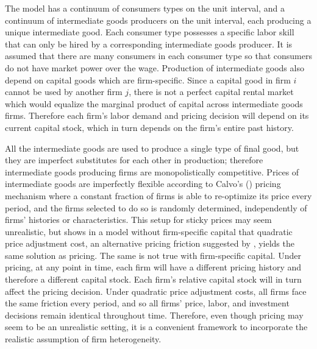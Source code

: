The model has a continuum of consumers types on the unit interval, and a continuum of intermediate goods producers on the unit interval, each producing a unique intermediate good.  Each consumer type possesses a specific labor skill that can only be hired by a corresponding intermediate goods producer.  It is assumed that there are many consumers in each consumer type so that consumers do not have market power over the wage.  Production of intermediate goods also depend on capital goods which are firm-specific.  Since a capital good in firm $i$ cannot be used by another firm $j$, there is not a perfect capital rental market which would equalize the marginal product of capital across intermediate goods firms.  Therefore each firm's labor demand and pricing decision will depend on its current capital stock, which in turn depends on the firm's entire past history.

All the intermediate goods are used to produce a single type of final good, but they are imperfect substitutes for each other in production; therefore intermediate goods producing firms are monopolistically competitive.  Prices of intermediate goods are imperfectly flexible according to Calvo's (\citeyear{calvo1983}) pricing mechanism where a constant fraction of firms is able to re-optimize its price every period, and the firms selected to do so is randomly determined, independently of firms' histories or characteristics.  This setup for sticky prices may seem unrealistic, but  shows in a model without firm-specific capital that quadratic price adjustment cost, an alternative pricing friction suggested by , yields the same solution as  pricing.  The same is not true with firm-specific capital.  Under  pricing, at any point in time, each firm will have a different pricing history and therefore a different capital stock.  Each firm's relative capital stock will in turn affect the pricing decision.  Under quadratic price adjustment costs, all firms face the same friction every period, and so all firms' price, labor, and investment decisions remain identical throughout time.  Therefore, even though  pricing may seem to be an unrealistic setting, it is a convenient framework to incorporate the realistic assumption of firm heterogeneity.

